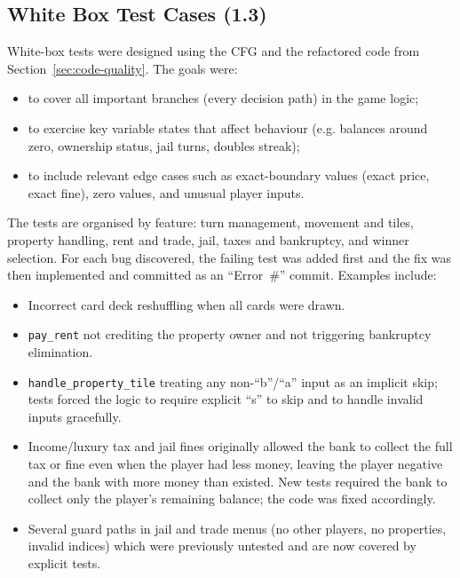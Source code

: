\documentclass[11pt]{article}
\begin{document}
\subsection{White Box Test Cases (1.3)}
\label{sec:white-box-tests}

White-box tests were designed using the CFG and the refactored code from Section~\ref{sec:code-quality}.  The goals were:

\begin{itemize}
  \item to cover all important branches (every decision path) in the game logic;
  \item to exercise key variable states that affect behaviour (e.g. balances around zero, ownership status, jail turns, doubles streak);
  \item to include relevant edge cases such as exact-boundary values (exact price, exact fine), zero values, and unusual player inputs.
\end{itemize}

The tests are organised by feature: turn management, movement and tiles, property handling, rent and trade, jail, taxes and bankruptcy, and winner selection.  For each bug discovered, the failing test was added first and the fix was then implemented and committed as an ``Error~\#'' commit.  Examples include:

\begin{itemize}
  \item Incorrect card deck reshuffling when all cards were drawn.
  \item \texttt{pay\_rent} not crediting the property owner and not triggering bankruptcy elimination.
  \item \texttt{handle\_property\_tile} treating any non-``b''/``a'' input as an implicit skip; tests forced the logic to require explicit ``s'' to skip and to handle invalid inputs gracefully.
  \item Income/luxury tax and jail fines originally allowed the bank to collect the full tax or fine even when the player had less money, leaving the player negative and the bank with more money than existed.  New tests required the bank to collect only the player's remaining balance; the code was fixed accordingly.
  \item Several guard paths in jail and trade menus (no other players, no properties, invalid indices) which were previously untested and are now covered by explicit tests.
\end{itemize}
\end{document}
